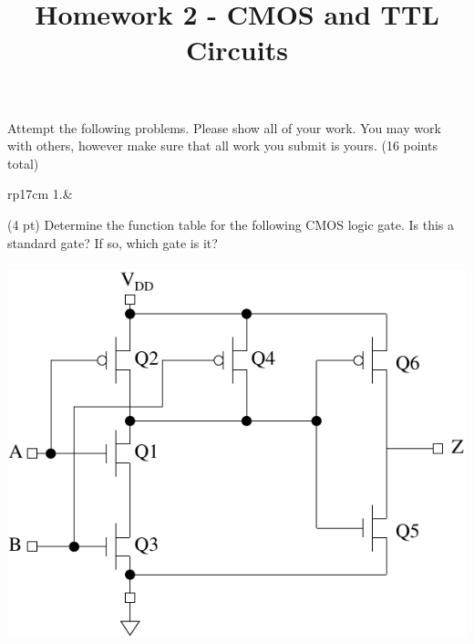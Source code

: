 \documentclass{article}
\title{Homework 2 - CMOS and TTL Circuits}
\date{}
\begin{document}
\maketitle
Attempt the following problems.  Please show all of your work.  You may work with others, however make sure that all work you submit is yours. (16 points total)
\begin{longtable}[l]{rp{17cm}}
1.&\begin{minipage}[t]{\linewidth}(4 pt) Determine the function table for the following CMOS logic gate.  Is this a standard gate?  If so, which gate is it? \\ \\
\includegraphics{../CMOSCircuits/Assessments/CMOSANDGate}\\


\end{minipage}
\end{longtable}
\end{document}
